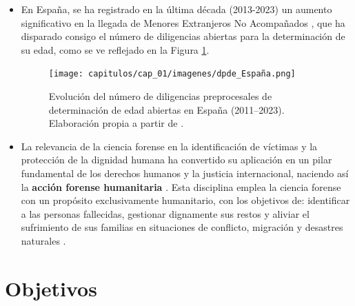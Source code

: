 \begin{itemize}

    \item En España, se ha registrado en la última década (2013-2023) un aumento significativo en la llegada
    de Menores Extranjeros No Acompañados \cite{fge2024,fge2019,fge2016,fge2013}, que ha disparado 
    consigo el número de diligencias abiertas para la determinación de su edad, como se ve reflejado 
    en la Figura \ref{fig:evolucion_DPDE}.

    \begin{figure}[h]
        \centering
        \texttt{[image: capitulos/cap\_01/imagenes/dpde\_España.png]}
        \caption{
            Evolución del número de diligencias preprocesales de determinación de edad abiertas en 
            España (2011–2023). 
            Elaboración propia a partir de \cite{fge2013,fge2016,fge2019, fge2024}.
        } 
        \label{fig:evolucion_DPDE}
    \end{figure}

    \item La relevancia de la ciencia forense en la identificación de víctimas y la protección de la dignidad 
    humana ha convertido su aplicación en un pilar fundamental de los derechos humanos y la justicia 
    internacional, naciendo así la  \textbf{acción forense humanitaria} \cite{cordner2017}. Esta disciplina 
    emplea la ciencia forense con un propósito exclusivamente humanitario, con los objetivos de: identificar 
    a las personas fallecidas, gestionar dignamente sus restos y aliviar el sufrimiento de sus familias en 
    situaciones de conflicto, migración y desastres naturales \cite{tidballbinz2021}. 

\end{itemize}


\section{Objetivos}

